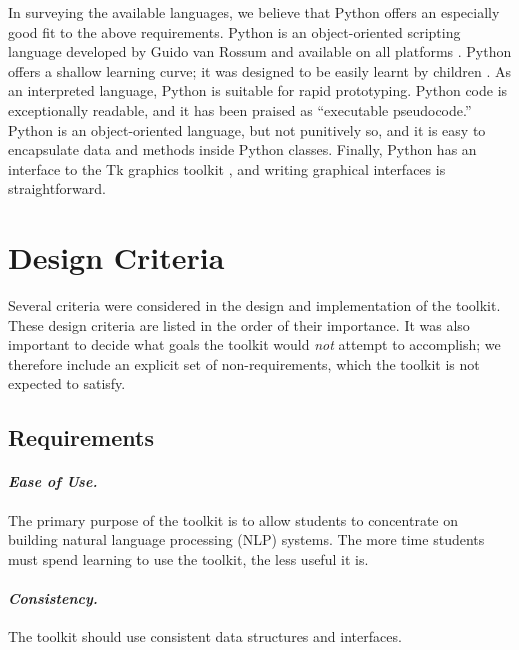 \documentclass[11pt]{article}
\begin{document}
In surveying the available languages, we believe that Python offers an
especially good fit to the above requirements.  Python is an
object-oriented scripting language developed by Guido van Rossum
and available on all platforms \cite{python}.  Python offers a
shallow learning curve; it was designed to be easily learnt by
children \cite{rossum99}.  As an interpreted language, Python is
suitable for rapid prototyping.  Python code is exceptionally
readable, and it has been praised as ``executable pseudocode.''
Python is an object-oriented language, but not punitively so, and it
is easy to encapsulate data and methods inside Python classes.
Finally, Python has an interface to the Tk graphics toolkit
\cite{tkinter}, and writing graphical interfaces is straightforward.

\section{Design Criteria}
\label{sec:criteria}

Several criteria were considered in the design and implementation of
the toolkit.  These design criteria are listed in the order of their
importance.  It was also important to decide what goals the toolkit
would \emph{not} attempt to accomplish; we therefore include an
explicit set of non-requirements, which the toolkit is not expected to
satisfy.

\subsection{Requirements}

\paragraph{\textit{Ease of Use.}} The primary purpose of the toolkit is
to allow students to concentrate on building natural language
processing (NLP) systems.  The more time students must spend learning
to use the toolkit, the less useful it is.

\paragraph{\textit{Consistency.}} The toolkit should use consistent data
structures and interfaces.
\end{document}
